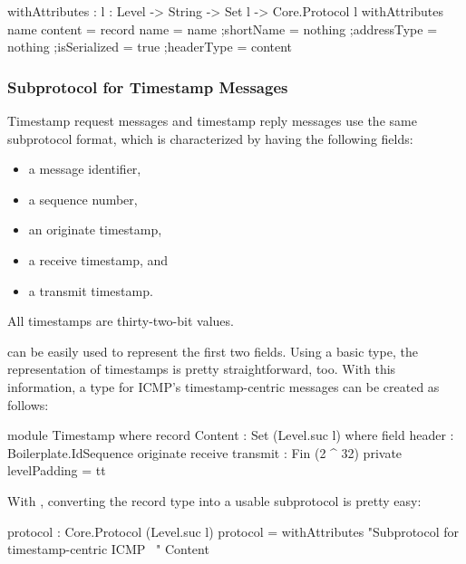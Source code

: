\documentclass{report}
\begin{document}
\begin{itemize}
\begin{code}
    withAttributes : {l : Level} -> String -> Set l -> Core.Protocol l
    withAttributes name content = record
      {name = name
      ;shortName = nothing
      ;addressType = nothing
      ;isSerialized = true
      ;headerType = content
      }
\end{code}

\subsubsection{Subprotocol for Timestamp Messages}
Timestamp request messages and timestamp reply messages use the same subprotocol format, which is characterized by having the following fields:

\begin{itemize}
  \item a message identifier,
  \item a sequence number,
  \item an originate timestamp,
  \item a receive timestamp, and
  \item a transmit timestamp.
\end{itemize}

All timestamps are thirty-two-bit values.

 can be easily used to represent the first two fields.  Using a basic  type, the representation of timestamps is pretty straightforward, too.  With this information, a type  for ICMP's timestamp-centric messages can be created as follows:

\begin{code}
    module Timestamp where
      record Content : Set (Level.suc l) where
        field
          header : Boilerplate.IdSequence
          originate
           receive
           transmit : Fin (2 ^ 32)
        private
          levelPadding = tt
\end{code}

With , converting the record type into a usable subprotocol is pretty easy:

\begin{code}
      protocol : Core.Protocol (Level.suc l)
      protocol = withAttributes "Subprotocol for timestamp-centric ICMP \
                                \messages"
                                Content
\end{code}


\end{itemize}
\end{document}
